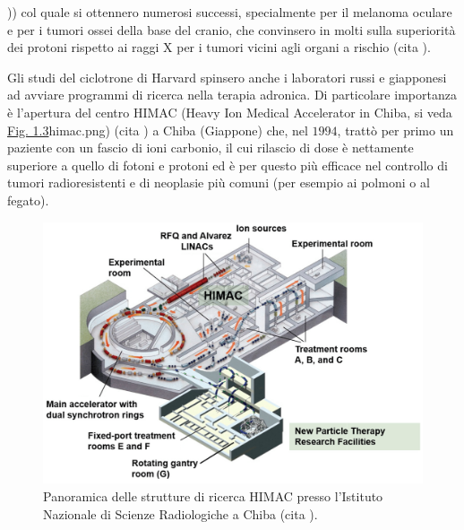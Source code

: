 \documentclass[12pt,a4paper,twoside]{report}
\begin{document}
	)) col quale si ottennero numerosi successi, specialmente per il melanoma oculare e per i tumori ossei della base del cranio, che convinsero in molti sulla superiorità dei protoni rispetto ai raggi X per i tumori vicini agli organi a rischio (cita
	).
	
	Gli studi del ciclotrone di Harvard spinsero anche i laboratori russi e giapponesi ad avviare programmi di ricerca nella terapia adronica. Di particolare importanza è l'apertura del centro HIMAC (Heavy Ion Medical Accelerator in Chiba, si veda \hyperref[fig:himac]{Fig. 1.3}himac.png) (cita
	) a Chiba (Giappone) che, nel $1994$, trattò per primo un paziente con un fascio di ioni carbonio, il cui rilascio di dose è nettamente superiore a quello di fotoni e protoni ed è per questo più efficace nel controllo di tumori radioresistenti e di neoplasie più comuni (per esempio ai polmoni o al fegato).
	
	\begin{figure}[H]
		\centering
		\includegraphics[width=0.9\linewidth]{images/himac.png}
		\caption{Panoramica delle strutture di ricerca HIMAC presso l'Istituto Nazionale di Scienze Radiologiche a Chiba (cita
			).}
		\label{fig:himac}
	\end{figure}
	
\end{document}

